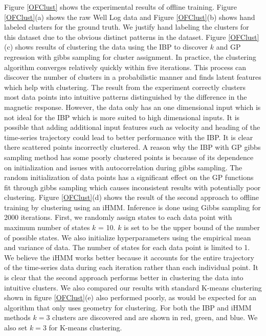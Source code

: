 \documentclass{article}
\begin{document}
Figure \ref{OFClust} shows the experimental results of offline training. Figure \ref{OFClust}(a) shows the raw Well Log data and Figure \ref{OFClust}(b) shows hand labeled clusters for the ground truth. We justify hand labeling the clusters for this dataset due to the obvious distinct patterns in the dataset. Figure \ref{OFClust}(c) shows results of clustering the data using the IBP to discover $k$ and GP regression with gibbs sampling for cluster assignment. In practice, the clustering algorithm converges relatively quickly within five iterations. This process can discover the number of clusters in a probabilistic manner and finds latent features which help with clustering. The result from the experiment correctly clusters most data points into intuitive patterns distinguished by the difference in the magnetic response. However, the data only has an one dimensional input which is not ideal for the IBP which is more suited to high dimensional inputs. It is possible that adding additional input features such as velocity and heading of the time-series trajectory could lead to better performance with the IBP. It is clear there scattered points incorrectly clustered. A reason why the IBP with GP gibbs sampling method has some poorly clustered points is because of its dependence on initialization and issues with autocorrelation during gibbs sampling. The random initialization of data points has a significant effect on the GP functions fit through gibbs sampling which causes inconsistent results with potentially poor clustering. Figure \ref{OFClust}(d) shows the result of the second approach to offline training by clustering using an iHMM. Inference is done using Gibbs sampling for 2000 iterations. First, we randomly assign states to each data point with maximum number of states $k$ = 10. $k$ is set to be the upper bound of the number of possible states. We also initialize hyperparameters using the empirical mean and variance of data. The number of states for each data point is limited to 1. We believe the iHMM works better because it accounts for the entire trajectory of the time-series data during each iteration rather than each individual point. It is clear that the second approach performs better in clustering the data into intuitive clusters. We also compared our results with standard K-means clustering shown in figure \ref{OFClust}(e) also performed poorly, as would be expected for an algorithm that only uses geometry for clustering. For both the IBP and iHMM methods $k=3$ clusters are discovered and are shown in red, green, and blue. We also set $k=3$ for K-means clustering.
\end{document}
